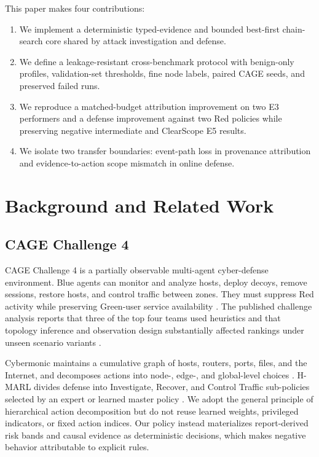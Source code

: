 \documentclass[runningheads]{llncs}
\begin{document}
This paper makes four contributions:
\begin{enumerate}
\item We implement a deterministic typed-evidence and bounded best-first chain-search core shared by attack investigation and defense.
\item We define a leakage-resistant cross-benchmark protocol with benign-only profiles, validation-set thresholds, fine node labels, paired CAGE seeds, and preserved failed runs.
\item We reproduce a matched-budget attribution improvement on two E3 performers and a defense improvement against two Red policies while preserving negative intermediate and ClearScope E5 results.
\item We isolate two transfer boundaries: event-path loss in provenance attribution and evidence-to-action scope mismatch in online defense.
\end{enumerate}

\section{Background and Related Work}

\subsection{CAGE Challenge 4}

CAGE Challenge 4 is a partially observable multi-agent cyber-defense environment. Blue agents can monitor and analyze hosts, deploy decoys, remove sessions, restore hosts, and control traffic between zones. They must suppress Red activity while preserving Green-user service availability \cite{kiely2025environment}. The published challenge analysis reports that three of the top four teams used heuristics and that topology inference and observation design substantially affected rankings under unseen scenario variants \cite{kiely2025challenge}.

Cybermonic maintains a cumulative graph of hosts, routers, ports, files, and the Internet, and decomposes actions into node-, edge-, and global-level choices \cite{cybermonic2025code}. H-MARL divides defense into Investigate, Recover, and Control Traffic sub-policies selected by an expert or learned master policy \cite{singh2025hmarl}. We adopt the general principle of hierarchical action decomposition but do not reuse learned weights, privileged indicators, or fixed action indices. Our policy instead materializes report-derived risk bands and causal evidence as deterministic decisions, which makes negative behavior attributable to explicit rules.
\end{document}
